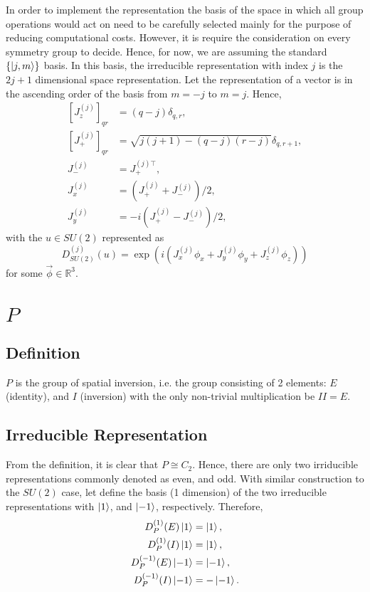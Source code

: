 \documentclass[preprint, 12pt]{revtex4-2}
\numberwithin{equation}{section}
\begin{document}
In order to implement the representation the basis of the space in which all group operations would act on need to be carefully selected mainly for the purpose of reducing computational costs. However, it is require the consideration on every symmetry group to decide. Hence, for now, we are assuming the standard $\{\ket{j, m}\}$ basis. In this basis, the irreducible representation with index $j$ is the $2j+1$ dimensional space representation. Let the representation of a vector is in the ascending order of the basis from $m = -j$ to $m = j$. Hence,
\begin{equation}
    \begin{aligned}
        \left[J_z^{(j)}\right]_{qr} &= (q-j)\delta_{q,r}, \\
        \left[J_+^{(j)}\right]_{qr} &= \sqrt{j(j+1)-(q-j)(r-j)}\delta_{q,r+1}, \\
        J_-^{(j)} &= J_+^{(j)\top}, \\
        J_x^{(j)} &= \left(J_+^{(j)}+J_-^{(j)}\right)/2, \\
        J_y^{(j)} &= -i\left(J_+^{(j)}-J_-^{(j)}\right)/2,
    \end{aligned}
\end{equation}
with the $u\in SU(2)$ represented as
\begin{equation}
    D^{(j)}_{SU(2)}(u) = \exp(i(J_x^{(j)}\phi_x+J_y^{(j)}\phi_y+J_z^{(j)}\phi_z))
\end{equation}
for some $\vec{\phi}\in\mathbb{R}^3$.

\section{$P$}

\subsection{Definition}
$P$ is the group of spatial inversion, i.e. the group consisting of 2 elements: $E$ (identity), and $I$ (inversion) with the only non-trivial multiplication be $II=E$.

\subsection{Irreducible Representation}
From the definition, it is clear that $P \cong C_2$. Hence, there are only two irriducible representations commonly denoted as even, and odd. With similar construction to the $SU(2)$ case, let define the basis (1 dimension) of the two irreducible representations with $\ket{1}$, and $\ket{-1}$, respectively. Therefore, 
\begin{equation}
    \begin{aligned}
        D_P^{(1)}(E)\ket{1} &= \ket{1}, \\
        D_P^{(1)}(I)\ket{1} &= \ket{1}, \\
        D_P^{(-1)}(E)\ket{-1} &= \ket{-1}, \\
        D_P^{(-1)}(I)\ket{-1} &=-\ket{-1}.
    \end{aligned}
\end{equation}
\end{document}
